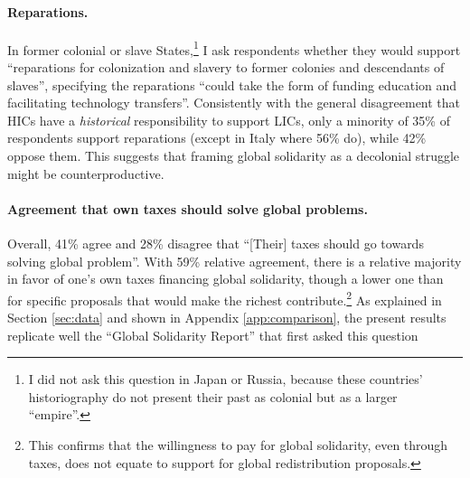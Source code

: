 \documentclass[12pt,english]{article}
\begin{document}
\begin{bibunit}
\paragraph{Reparations.}

In former colonial or slave States,\footnote{I did not ask this question in Japan or Russia, because these countries' historiography do not present their past as colonial but as a larger ``empire''.} 
I ask respondents whether they would support ``reparations for colonization and slavery to former colonies and descendants of slaves'', specifying the reparations ``could take the form of funding education and facilitating technology transfers''. Consistently with the general disagreement that HICs have a \textit{historical} responsibility to support LICs, only a minority of 35\% of respondents support reparations (except in Italy where 56\% do), while 42\% oppose them. This suggests that framing global solidarity as a decolonial struggle might be counterproductive.

\paragraph{Agreement that own taxes should solve global problems.}

Overall, 41\% agree and 28\% disagree that ``[Their] taxes should go towards solving global problem''. With 59\% relative agreement, there is a relative majority in favor of one's own taxes financing global solidarity, though a lower one than for specific proposals that would make the richest contribute.\footnote{This confirms that the willingness to pay for global solidarity, even through taxes, does not equate to support for global redistribution proposals. %
} 
As explained in Section \ref{sec:data} and shown in Appendix \ref{app:comparison}, the present results replicate well the ``Global Solidarity Report'' that first asked this question \citep{global_nation_global_2023}



\end{bibunit}
\end{document}
